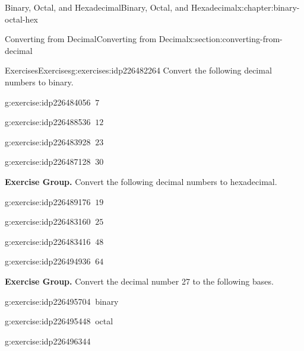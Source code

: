 \documentclass[twoside,10pt,]{book}
\numberwithin{equation}{section}
\begin{document}
\begin{chapterptx}{Binary, Octal, and Hexadecimal}{}{Binary, Octal, and Hexadecimal}{}{}{x:chapter:binary-octal-hex}
\begin{sectionptx}{Converting from Decimal}{}{Converting from Decimal}{}{}{x:section:converting-from-decimal}
\begin{exercises-subsection}{Exercises}{}{Exercises}{}{}{g:exercises:idp226482264}
Convert the following decimal numbers to binary.\begin{exercisegroup}
\begin{divisionexerciseeg}{5}{}{}{g:exercise:idp226484056}%
\(\ 7\)\end{divisionexerciseeg}%
\begin{divisionexerciseeg}{6}{}{}{g:exercise:idp226488536}%
\(\ 12\)\end{divisionexerciseeg}%
\begin{divisionexerciseeg}{7}{}{}{g:exercise:idp226483928}%
\(\ 23\)\end{divisionexerciseeg}%
\begin{divisionexerciseeg}{8}{}{}{g:exercise:idp226487128}%
\(\ 30\)\end{divisionexerciseeg}%
\end{exercisegroup}
\par\medskip\noindent
\par\medskip\noindent%
\textbf{Exercise Group.}\space\space%
Convert the following decimal numbers to hexadecimal.\begin{exercisegroup}
\begin{divisionexerciseeg}{9}{}{}{g:exercise:idp226489176}%
\(\ 19\)\end{divisionexerciseeg}%
\begin{divisionexerciseeg}{10}{}{}{g:exercise:idp226483160}%
\(\ 25\)\end{divisionexerciseeg}%
\begin{divisionexerciseeg}{11}{}{}{g:exercise:idp226483416}%
\(\ 48\)\end{divisionexerciseeg}%
\begin{divisionexerciseeg}{12}{}{}{g:exercise:idp226494936}%
\(\ 64\)\end{divisionexerciseeg}%
\end{exercisegroup}
\par\medskip\noindent
\par\medskip\noindent%
\textbf{Exercise Group.}\space\space%
Convert the decimal number 27 to the following bases.\begin{exercisegroup}
\begin{divisionexerciseeg}{13}{}{}{g:exercise:idp226495704}%
\(\ \)binary\end{divisionexerciseeg}%
\begin{divisionexerciseeg}{14}{}{}{g:exercise:idp226495448}%
\(\ \)octal\end{divisionexerciseeg}%
\begin{divisionexerciseeg}{15}{}{}{g:exercise:idp226496344}%

\end{divisionexerciseeg}
\end{exercisegroup}
\end{exercises-subsection}
\end{sectionptx}
\end{chapterptx}
\end{document}
